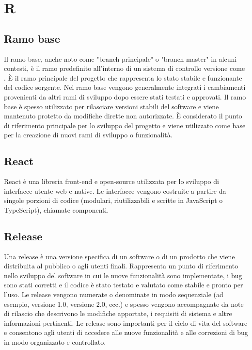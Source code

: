 \section{R}

\vspace{2em}
\subsection*{Ramo base}
\par Il ramo base, anche noto come "branch principale" o "branch master" in alcuni contesti, è il ramo predefinito all'interno di un sistema di controllo versione come . È il ramo principale del progetto che rappresenta lo stato stabile e funzionante del codice sorgente. Nel ramo base vengono generalmente integrati i cambiamenti provenienti da altri rami di sviluppo dopo essere stati testati e approvati. Il ramo base è spesso utilizzato per rilasciare versioni stabili del software e viene mantenuto protetto da modifiche dirette non autorizzate. È considerato il punto di riferimento principale per lo sviluppo del progetto e viene utilizzato come base per la creazione di nuovi rami di sviluppo o funzionalità.

\vspace{2em}
\subsection*{React}
\par React è una libreria front-end e open-source utilizzata per lo sviluppo di interfacce utente web e native. Le interfacce vengono costruite a partire da singole porzioni di codice (modulari, riutilizzabili e scritte in JavaScript o TypeScript), chiamate componenti.

\vspace{2em}
\subsection*{Release}
\par Una release è una versione specifica di un software o di un prodotto che viene distribuita al pubblico o agli utenti finali. Rappresenta un punto di riferimento nello sviluppo del software in cui le nuove funzionalità sono implementate, i bug sono stati corretti e il codice è stato testato e valutato come stabile e pronto per l'uso. Le release vengono numerate o denominate in modo sequenziale (ad esempio, versione 1.0, versione 2.0, ecc.) e spesso vengono accompagnate da note di rilascio che descrivono le modifiche apportate, i requisiti di sistema e altre informazioni pertinenti. Le release sono importanti per il ciclo di vita del software e consentono agli utenti di accedere alle nuove funzionalità e alle correzioni di bug in modo organizzato e controllato.

